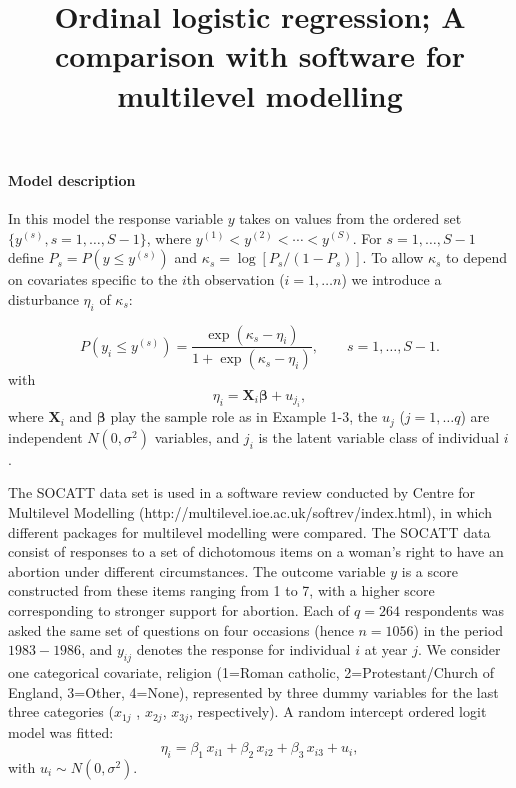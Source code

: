\documentclass{article}
\begin{document}
\title{Ordinal logistic regression; A comparison with software for
multilevel modelling}
\author{}
\maketitle

\paragraph{\protect\bigskip Model description}

\bigskip In this model the response variable $y$ takes on values from the
ordered set $\{y^{(s)},s=1,\ldots ,S-1\}$, where $y^{(1)}<y^{(2)}<\cdots
<y^{(S)}$. For $s=1,\ldots ,S-1$ define $P_{s}=P\left( y\leq y^{(s)}\right) $
and $\kappa _{s}=\log [P_{s}/(1-P_{s})]$. To allow $\kappa _{s}$ to depend
on covariates specific to the $i$th observation ($i=1,\ldots n$) we
introduce a disturbance $\eta _{i}$ of $\kappa _{s}$:

\begin{equation}
P\left( y_{i}\leq y^{(s)}\right) =\frac{\exp (\kappa _{s}-\eta _{i})}{1+\exp
(\kappa _{s}-\eta _{i})},\qquad s=1,\ldots ,S-1.
\end{equation}%
with%
\begin{equation}
\eta _{i}=\mathbf{X}_{i}\mathbf{\beta }+u_{j_{i}},
\end{equation}%
where $\mathbf{X}_{i}$ and $\mathbf{\beta }$ play the sample role as in
Example 1-3, the $u_{j}$ ($j=1,\ldots q$) are independent $N(0,\sigma ^{2})$
variables, and $j_{i}$ is the latent variable class of individual $i$.

The SOCATT data set is used in a software review conducted by Centre for
Multilevel Modelling (http://multilevel.ioe.ac.uk/softrev/index.html), in
which different packages for multilevel modelling were compared. The SOCATT
data consist of responses to a set of dichotomous items on a woman's right
to have an abortion under different circumstances. The outcome variable $y$
is a score constructed from these items ranging from 1 to 7, with a higher
score corresponding to stronger support for abortion. Each of $q=264$
respondents was asked the same set of questions on four occasions (hence $%
n=1056$) in the period $1983-1986$, and $y_{ij}$ denotes the response for
individual $i$ at year $j$. We consider one categorical covariate, religion
(1=Roman catholic, 2=Protestant/Church of England, 3=Other, 4=None),
represented by three dummy variables for the last three categories ($x_{1j}$%
, $x_{2j}$, $x_{3j}$, respectively). A random intercept ordered logit model
was fitted: 
\begin{equation}
\eta _{i}=\beta _{1}\,x_{i1}+\beta _{2}\,x_{i2}+\beta _{3}\,x_{i3}+u_{i},
\label{eta_ordinal}
\end{equation}%
with $u_{i}\sim N(0,\sigma ^{2})$.
\end{document}
